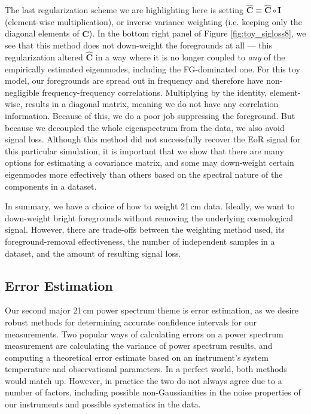 \documentclass[preprint2,numberedappendix,tighten]{aastex6}  %
\begin{document}
The last regularization scheme we are highlighting here is setting $\widehat{\textbf{C}} \equiv \widehat{\textbf{C}} \circ \textbf{I}$ (element-wise multiplication), or inverse variance weighting (i.e. keeping only the diagonal elements of $\widehat{\textbf{C}}$). In the bottom right 
panel of Figure \ref{fig:toy_sigloss8}, we see that this method does not down-weight the foregrounds at all --- this regularization altered $\widehat{\textbf{C}}$ in a way where it is no longer coupled to \textit{any} of the empirically estimated eigenmodes, including the FG-dominated one. For this toy model, 
our foregrounds are spread out in frequency and therefore have non-negligible frequency-frequency correlations. Multiplying by 
the identity, element-wise, results in a diagonal matrix, meaning we do not have any correlation information. Because of this, we do a poor job 
suppressing the foreground. But because we decoupled the whole eigenspectrum from the data, we also avoid signal loss. Although this method did not successfully recover the EoR signal for this particular simulation, it is important that we show that there 
are many options for estimating a covariance matrix, and some may down-weight certain eigenmodes more effectively than others based on the spectral nature 
of the components in a dataset. 

In summary, we have a choice of how to weight 21\,cm data. Ideally, we want to down-weight bright foregrounds without 
removing the underlying cosmological signal. However, there are trade-offs between the weighting method 
used, its foreground-removal effectiveness, the number of independent samples in a dataset, and the amount of resulting signal loss. 

\color{black}


\subsection{Error Estimation}
\label{sec:ErrorOverview}

Our second major 21\,cm power spectrum theme is error estimation, as we desire robust methods for determining accurate 
confidence intervals for our measurements. Two popular ways of calculating errors on a power spectrum 
measurement are calculating the variance of power spectrum results, and computing a theoretical error estimate based on an instrument's 
system temperature and observational parameters. In a perfect world, both methods would match up. However, in practice the 
two do not always agree due to a number of factors, including possible non-Gaussianities in the noise properties of our instruments and possible systematics in the data.
\end{document}
